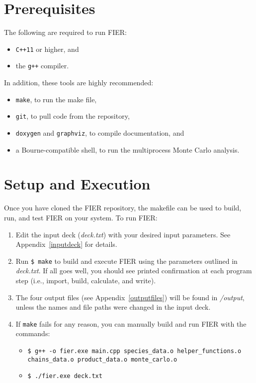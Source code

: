 \documentclass{article}
\begin{document}
\section{Prerequisites}

The following are required to run FIER:
\begin{itemize}
    \item \texttt{C++11} or higher, and
    \item the \texttt{g++} compiler.
\end{itemize}
In addition, these tools are highly recommended:
\begin{itemize}
    \item \texttt{make}, to run the make file,
    \item \texttt{git}, to pull code from the repository,
    \item \texttt{doxygen} and \texttt{graphviz}, to compile documentation, and
    \item a Bourne-compatible shell, to run the multiprocess Monte Carlo analysis.
\end{itemize}


\section{Setup and Execution}

\noindent Once you have cloned the FIER repository, the makefile can be used to build, run, and test FIER on your system. To run FIER:

\begin{enumerate}
    \item Edit the input deck (\textit{deck.txt}) with your desired input parameters. See Appendix~\ref{inputdeck} for details. 
    \item Run \texttt{\$ make} to build and execute FIER using the parameters outlined in \textit{deck.txt}. If all goes well, you should see printed confirmation at each program step (i.e., import, build, calculate, and write).
    \item The four output files (see Appendix~\ref{outputfiles}) will be found in \textit{/output}, unless the names and file paths were changed in the input deck.
    \item If \texttt{make} fails for any reason, you can manually build and run FIER with the commands:
    \begin{itemize}
        \item \texttt{\$ g++ -o fier.exe main.cpp species\_data.o helper\_functions.o\\ chains\_data.o product\_data.o monte\_carlo.o}
        \item \texttt{\$ ./fier.exe deck.txt}
    \end{itemize}
\end{enumerate}
\end{document}
